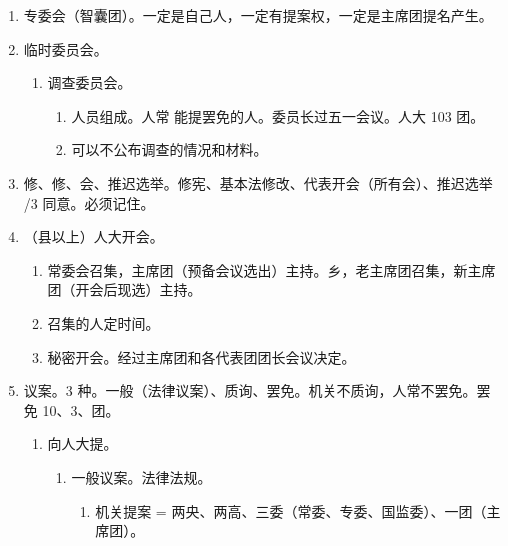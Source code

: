 \begin{enumerate}
\begin{enumerate}
          \item 权利。
                \begin{enumerate}
                  \item 人常可开火，没说停火。
                  \item 重要类条约。参看三国。。
                  \item 特赦。
                  \item 国家勋章、国家荣誉称号、友谊勋章（）。
                \end{enumerate}
        \end{enumerate}
  \item 专委会（智囊团）。一定是自己人，一定有提案权，一定是主席团提名产生。
  \item 临时委员会。
        \begin{enumerate}
          \item 调查委员会。
                \begin{enumerate}
                  \item 人员组成。人常 \yjt 能提罢免的人。委员长过五一会议。人大 103 团。
                  \item 可以不公布调查的情况和材料。
                \end{enumerate}
        \end{enumerate}
  \item 修、修、会、推迟选举。修宪、基本法修改、代表开会（所有会）、推迟选举 /3 同意。必须记住。
  \item （县以上）人大开会。
        \begin{enumerate}
          \item 常委会召集，主席团（预备会议选出）主持。乡，老主席团召集，新主席团（开会后现选）主持。
          \item 召集的人定时间。
          \item 秘密开会。经过主席团和各代表团团长会议决定。
        \end{enumerate}
  \item 议案。3 种。一般（法律议案）、质询、罢免。机关不质询，人常不罢免。罢免 10、3、团。
        \begin{enumerate}
          \item 向人大提。
                \begin{enumerate}
                  \item 一般议案。法律法规。
                        \begin{enumerate}
                          \item 机关提案 = 两央、两高、三委（常委、专委、国监委）、一团（主席团）。

\end{enumerate}
\end{enumerate}
\end{enumerate}
\end{enumerate}

